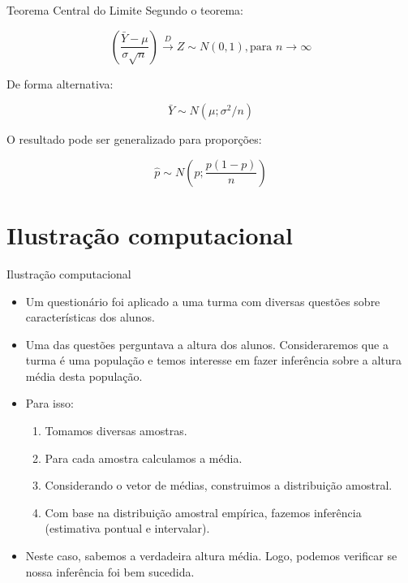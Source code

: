 \documentclass[
  ignorenonframetext,
  serif,
  professionalfont,
  usenames,
  dvipsnames,
  aspectratio = 169]{beamer}
\providecommand{\tightlist}{%
  \setlength{\itemsep}{0pt}\setlength{\parskip}{0pt}}
\renewcommand{\tightlist}{%
  \setlength{\itemsep}{0\baselineskip}
  \setlength{\parskip}{0.25\baselineskip}
}
\begin{document}
\begin{frame}{Teorema Central do Limite}
\protect\hypertarget{teorema-central-do-limite-3}{}
Segundo o teorema:

\[\left (\frac{\bar{Y} - \mu}{\sigma\sqrt{n}} \right) \overset{D}{\rightarrow} Z \sim N(0,1), \text{para } n \rightarrow \infty\]

De forma alternativa:

\[\bar{Y} \sim N(\mu; \sigma^2/n)\]

O resultado pode ser generalizado para proporções:

\[\hat{p} \sim N \left ( p; \frac{p(1-p)}{n} \right )\]
\end{frame}

\hypertarget{ilustrauxe7uxe3o-computacional}{%
\section{Ilustração
computacional}\label{ilustrauxe7uxe3o-computacional}}

\begin{frame}{Ilustração computacional}
\protect\hypertarget{ilustrauxe7uxe3o-computacional-1}{}
\begin{itemize}
\tightlist
\item
  Um questionário foi aplicado a uma turma com diversas questões sobre
  características dos alunos.
\end{itemize}

\vspace{0.3cm}

\begin{itemize}
\tightlist
\item
  Uma das questões perguntava a altura dos alunos. Consideraremos que a
  turma é uma população e temos interesse em fazer inferência sobre a
  altura média desta população.
\end{itemize}

\vspace{0.3cm}

\begin{itemize}
\tightlist
\item
  Para isso:

  \begin{enumerate}
  \tightlist
  \item
    Tomamos diversas amostras.
  \item
    Para cada amostra calculamos a média.
  \item
    Considerando o vetor de médias, construimos a distribuição amostral.
  \item
    Com base na distribuição amostral empírica, fazemos inferência
    (estimativa pontual e intervalar).
  \end{enumerate}
\end{itemize}

\vspace{0.3cm}

\begin{itemize}
\tightlist
\item
  Neste caso, sabemos a verdadeira altura média. Logo, podemos verificar
  se nossa inferência foi bem sucedida.
\end{itemize}
\end{frame}
\end{document}

